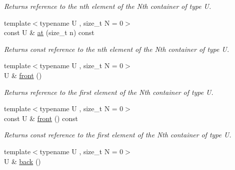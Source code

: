 \begin{DoxyCompactItemize}
\begin{DoxyCompactList}\small\item\em Returns reference to the nth element of the Nth container of type U. \end{DoxyCompactList}\item 
\hypertarget{classheterogeneous_1_1heterodeque_3_01_t_00_01_types_8_8_8_4_a12404dca1adeca0c497d4e0203bdde3d}{}{\footnotesize template$<$typename U , size\+\_\+t N = 0$>$ }\\const U \& \hyperlink{classheterogeneous_1_1heterodeque_3_01_t_00_01_types_8_8_8_4_a12404dca1adeca0c497d4e0203bdde3d}{at} (size\+\_\+t n) const \label{classheterogeneous_1_1heterodeque_3_01_t_00_01_types_8_8_8_4_a12404dca1adeca0c497d4e0203bdde3d}

\begin{DoxyCompactList}\small\item\em Returns const reference to the nth element of the Nth container of type U. \end{DoxyCompactList}\item 
\hypertarget{classheterogeneous_1_1heterodeque_3_01_t_00_01_types_8_8_8_4_a38b45b962c13e7b5d4722ca6c66659da}{}{\footnotesize template$<$typename U , size\+\_\+t N = 0$>$ }\\U \& \hyperlink{classheterogeneous_1_1heterodeque_3_01_t_00_01_types_8_8_8_4_a38b45b962c13e7b5d4722ca6c66659da}{front} ()\label{classheterogeneous_1_1heterodeque_3_01_t_00_01_types_8_8_8_4_a38b45b962c13e7b5d4722ca6c66659da}

\begin{DoxyCompactList}\small\item\em Returns reference to the first element of the Nth container of type U. \end{DoxyCompactList}\item 
\hypertarget{classheterogeneous_1_1heterodeque_3_01_t_00_01_types_8_8_8_4_afdd95bbbf855440608d05bad1208900e}{}{\footnotesize template$<$typename U , size\+\_\+t N = 0$>$ }\\const U \& \hyperlink{classheterogeneous_1_1heterodeque_3_01_t_00_01_types_8_8_8_4_afdd95bbbf855440608d05bad1208900e}{front} () const \label{classheterogeneous_1_1heterodeque_3_01_t_00_01_types_8_8_8_4_afdd95bbbf855440608d05bad1208900e}

\begin{DoxyCompactList}\small\item\em Returns const reference to the first element of the Nth container of type U. \end{DoxyCompactList}\item 
\hypertarget{classheterogeneous_1_1heterodeque_3_01_t_00_01_types_8_8_8_4_a221334cf963a827fb38ade46797ccae5}{}{\footnotesize template$<$typename U , size\+\_\+t N = 0$>$ }\\U \& \hyperlink{classheterogeneous_1_1heterodeque_3_01_t_00_01_types_8_8_8_4_a221334cf963a827fb38ade46797ccae5}{back} ()\label{classheterogeneous_1_1heterodeque_3_01_t_00_01_types_8_8_8_4_a221334cf963a827fb38ade46797ccae5}


\end{DoxyCompactItemize}

